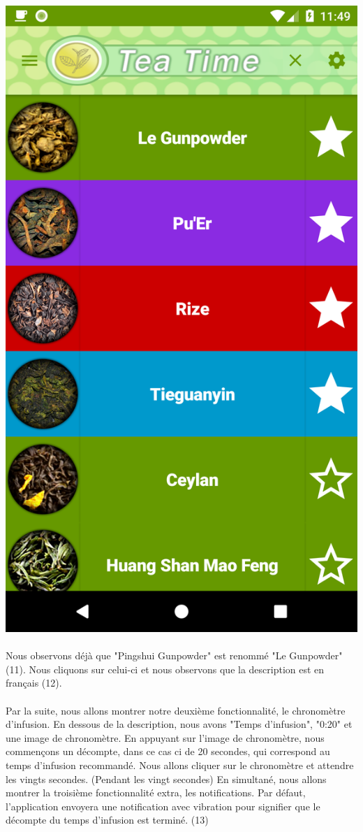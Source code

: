 \documentclass[a4paper,12pt]{article}
\begin{document}
\begin{spacing}{1}
	\includegraphics*[scale=0.1]{Screenshot/14.png}\\\\
	Nous observons déjà que "Pingshui Gunpowder" est renommé "Le Gunpowder" (11). Nous cliquons sur celui-ci et nous observons que la description est en français (12).\\\\
	Par la suite, nous allons montrer notre deuxième fonctionnalité, le chronomètre d'infusion. En dessous de la description, nous avons "Temps d'infusion", "0:20" et une image de chronomètre. En appuyant sur l'image de chronomètre, nous commençons un décompte, dans ce cas ci de 20 secondes, qui correspond au temps d'infusion recommandé. Nous allons cliquer sur le chronomètre et attendre les vingts secondes. (Pendant les vingt secondes) En simultané, nous allons montrer la troisième fonctionnalité extra, les notifications. Par défaut, l'application envoyera une notification avec vibration pour signifier que le décompte du temps d'infusion est terminé. (13)\\\\

\end{spacing}
\end{document}
